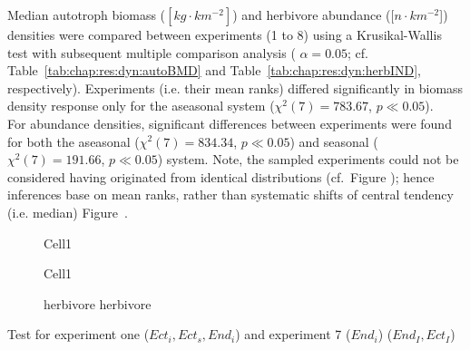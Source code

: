 Median autotroph biomass ($[kg\cdot km^{-2}]$) and herbivore abundance ($[n\cdot km^{-2}$]) densities were compared between experiments (1 to 8) using a Krusikal-Wallis test with subsequent multiple comparison analysis ( $\alpha = 0.05$; cf. Table~\ref{tab:chap:res:dyn:autoBMD} and Table~\ref{tab:chap:res:dyn:herbIND}, respectively). 
Experiments (i.e. their mean ranks) differed significantly in biomass density response only for the aseasonal  system ($\chi^{2}(7) = 783.67$, $p \ll 0.05$). 
\\
For abundance densities, significant differences between experiments were found for both the aseasonal ($\chi^{2}(7) = 834.34$, $p \ll 0.05$) and seasonal ($\chi^{2}(7) = 191.66$, $p \ll 0.05$) system. 
Note, the sampled experiments could not be considered having originated from identical distributions (cf.~Figure ); 
hence inferences base on mean ranks, rather than systematic shifts of central tendency (i.e. median) Figure~.




\begin{figure}
\centering

\caption[Average body mass (seasonal system)]{Cell1}
\label{fig:chap:res:dyn:cell1:avg}
\end{figure}


\begin{figure}
\centering

\caption{Cell1}
\label{fig:chap:res:dyn:cell1}
\end{figure}




\begin{figure}
\centering

\caption[Effect of carnivore group composition on herbivore biomass and abundance density]{herbivore herbivore}
\label{fig:chap:res:dyn:compherb}
\end{figure}


Test for experiment one ($Ect_i, Ect_s, End_i$) and experiment 7 ($End_i$) ($End_I, Ect_I$)

%
%